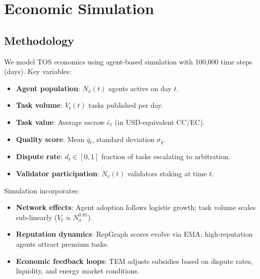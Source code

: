 \documentclass[11pt]{article}
\begin{document}
\section{Economic Simulation}
\label{sec:econ-sim}

\subsection{Methodology}
We model TOS economics using agent-based simulation with 100,000 time steps (days). Key variables:
\begin{itemize}[noitemsep]
  \item \textbf{Agent population}: $N_a(t)$ agents active on day $t$.
  \item \textbf{Task volume}: $V_t(t)$ tasks published per day.
  \item \textbf{Task value}: Average escrow $\bar{e}_t$ (in USD-equivalent CC/EC).
  \item \textbf{Quality score}: Mean $\bar{q}_t$, standard deviation $\sigma_q$.
  \item \textbf{Dispute rate}: $d_t \in [0,1]$ fraction of tasks escalating to arbitration.
  \item \textbf{Validator participation}: $N_v(t)$ validators staking at time $t$.
\end{itemize}
Simulation incorporates:
\begin{itemize}[noitemsep]
  \item \textbf{Network effects}: Agent adoption follows logistic growth; task volume scales sub-linearly ($V_t \propto N_a^{0.85}$).
  \item \textbf{Reputation dynamics}: RepGraph scores evolve via EMA; high-reputation agents attract premium tasks.
  \item \textbf{Economic feedback loops}: TEM adjusts subsidies based on dispute rates, liquidity, and energy market conditions.
\end{itemize}
\end{document}
